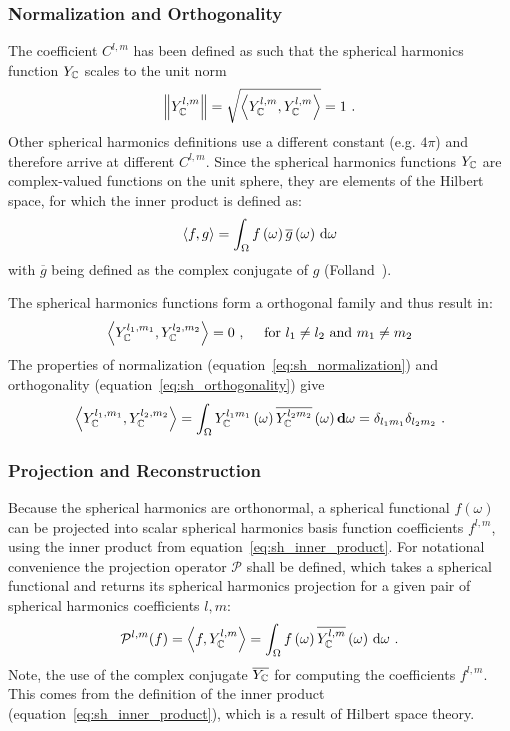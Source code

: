 \subsubsection*{Normalization and Orthogonality}

The coefficient $C^{l,m}$ has been defined as such that the spherical harmonics function $Y_{\mathbb{C}}$ scales to the unit norm
\begin{align}
\label{eq:sh_normalization}
\left\lVert Y_{\mathbb{C}}^{l,m}\right\rVert = \sqrt{\left<Y_{\mathbb{C}}^{l,m}, Y_{\mathbb{C}}^{l,m}\right>} = 1
\ .
\end{align}
Other spherical harmonics definitions use a different constant (e.g. $4\pi$) and therefore arrive at different $C^{l,m}$. Since the spherical harmonics functions $Y_{\mathbb{C}}$ are complex-valued functions on the unit sphere, they are elements of the Hilbert space, for which the inner product is defined as:
\begin{align}
\label{eq:sh_inner_product}
\left<f,g\right> = \int_\Omega f\left(\omega\right)\overline{g}\left(\omega\right)\,\mathrm{d}\omega
\end{align}
with $\overline{g}$ being defined as the complex conjugate of $g$ (Folland~\cite{Folland92}).

The spherical harmonics functions form a orthogonal family and thus result in:
\begin{align}
\left<Y_{\mathbb{C}}^{l_1, m_1},Y_{\mathbb{C}}^{l_2, m_2}\right>
=
0
\ ,\quad\text{ for } l_1 \ne l_2 \text{ and } m_1 \ne m_2
\end{align}
The properties of normalization (equation~\ref{eq:sh_normalization}) and orthogonality (equation~\ref{eq:sh_orthogonality}) give
\begin{align}
\label{eq:sh_orthogonality}
\left<Y_{\mathbb{C}}^{l_1, m_1},Y_{\mathbb{C}}^{l_2, m_2}\right>=
\int_{\Omega} Y_{\mathbb{C}}^{l_1m_1}\left(\omega\right) \overline{Y_{\mathbb{C}}^{l_2m_2}}\left(\omega\right) \mathbf{d}\omega = \delta_{l_1m_1}\delta_{l_2m_2}
\ .
\end{align}

\subsubsection*{Projection and Reconstruction}

Because the spherical harmonics are orthonormal, a spherical functional $f\left(\omega\right)$ can be projected into scalar spherical harmonics basis function coefficients $f^{l,m}$, using the inner product from equation~\ref{eq:sh_inner_product}. For notational convenience the projection operator $\mathcal{P}$ shall be defined, which takes a spherical functional and returns its spherical harmonics projection for a given pair of spherical harmonics coefficients $l,m$:
\begin{align}
\label{eq:sh_projection}
\mathcal{P}^{l, m}(f) =  \left<f,Y_{\mathbb{C}}^{l, m}\right> = 
\int_\Omega f\left(\omega\right)\overline{Y_{\mathbb{C}}^{l,m}}\left(\omega\right)\,\mathrm{d}\omega
\ .
\end{align}
Note, the use of the complex conjugate $\overline{Y_{\mathbb{C}}}$ for computing the coefficients $f^{l,m}$. This comes from the definition of the inner product (equation~\ref{eq:sh_inner_product}), which is a result of Hilbert space theory. 

